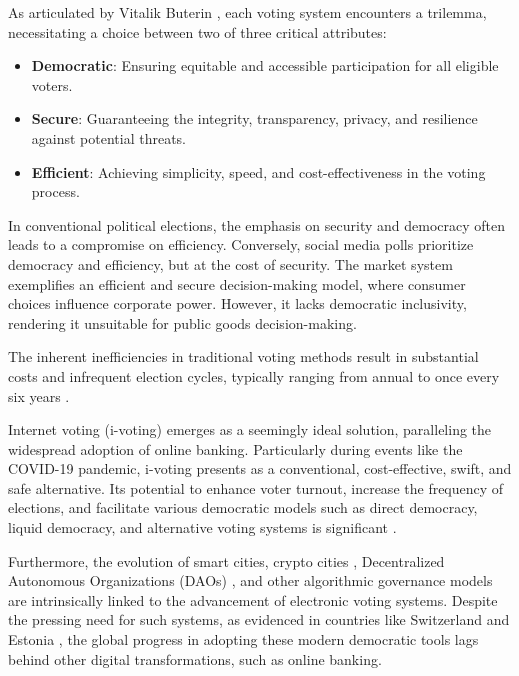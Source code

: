 \documentclass[runningheads]{llncs}
\begin{document}
As articulated by Vitalik Buterin \cite{buterinBlockchainVotingOverrated2021}, each voting system encounters a trilemma, necessitating a choice between two of three critical attributes:

\begin{itemize}
\item \textbf{Democratic}: Ensuring equitable and accessible participation for all eligible voters.
\item \textbf{Secure}: Guaranteeing the integrity, transparency, privacy, and resilience against potential threats.
\item \textbf{Efficient}: Achieving simplicity, speed, and cost-effectiveness in the voting process.
\end{itemize}

In conventional political elections, the emphasis on security and democracy often leads to a compromise on efficiency. Conversely, social media polls prioritize democracy and efficiency, but at the cost of security. The market system exemplifies an efficient and secure decision-making model, where consumer choices influence corporate power. However, it lacks democratic inclusivity, rendering it unsuitable for public goods decision-making.

The inherent inefficiencies in traditional voting methods result in substantial costs and infrequent election cycles, typically ranging from annual to once every six years \cite{buterinBlockchainVotingOverrated2021}.

Internet voting (i-voting) emerges as a seemingly ideal solution, paralleling the widespread adoption of online banking. Particularly during events like the COVID-19 pandemic, i-voting presents as a conventional, cost-effective, swift, and safe alternative. Its potential to enhance voter turnout, increase the frequency of elections, and facilitate various democratic models such as direct democracy, liquid democracy, and alternative voting systems is significant \cite{laslierLoserPluralityVoting2011}.

Furthermore, the evolution of smart cities, crypto cities \cite{buterinCryptoCities2021}, Decentralized Autonomous Organizations (DAOs) \cite{wangDecentralizedAutonomousOrganizations2019}, and other algorithmic governance models \cite{GovernmentAlgorithm2022} are intrinsically linked to the advancement of electronic voting systems. Despite the pressing need for such systems, as evidenced in countries like Switzerland \cite{ElectronicVotingSwitzerland2023} and Estonia \cite{ElectronicVotingEstonia2023}, the global progress in adopting these modern democratic tools lags behind other digital transformations, such as online banking.
\end{document}
